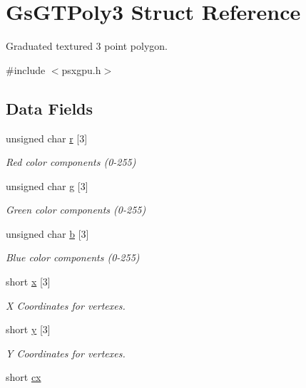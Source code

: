\hypertarget{structGsGTPoly3}{}\section{Gs\+G\+T\+Poly3 Struct Reference}
\label{structGsGTPoly3}


Graduated textured 3 point polygon.  




{\ttfamily \#include $<$psxgpu.\+h$>$}

\subsection*{Data Fields}
\begin{DoxyCompactItemize}
\item 
unsigned char \hyperlink{structGsGTPoly3_a1869eeb590a6ed85a2e1953e6f17974e}{r} \mbox{[}3\mbox{]}
\begin{DoxyCompactList}\small\item\em Red color components (0-\/255) \end{DoxyCompactList}\item 
unsigned char \hyperlink{structGsGTPoly3_ad9ba5a12d15b625a353aededf0b17f79}{g} \mbox{[}3\mbox{]}
\begin{DoxyCompactList}\small\item\em Green color components (0-\/255) \end{DoxyCompactList}\item 
unsigned char \hyperlink{structGsGTPoly3_a75426e268d13960d7da50c31f11b4a00}{b} \mbox{[}3\mbox{]}
\begin{DoxyCompactList}\small\item\em Blue color components (0-\/255) \end{DoxyCompactList}\item 
short \hyperlink{structGsGTPoly3_ae3714403a39ee1e80b370b998ec83b29}{x} \mbox{[}3\mbox{]}
\begin{DoxyCompactList}\small\item\em X Coordinates for vertexes. \end{DoxyCompactList}\item 
short \hyperlink{structGsGTPoly3_ab314ec9af8c175188d644ff048df69d1}{y} \mbox{[}3\mbox{]}
\begin{DoxyCompactList}\small\item\em Y Coordinates for vertexes. \end{DoxyCompactList}\item 
short \hyperlink{structGsGTPoly3_a0e3b4b00180357f07f68ef9de4a22b23}{cx}

\end{DoxyCompactItemize}
